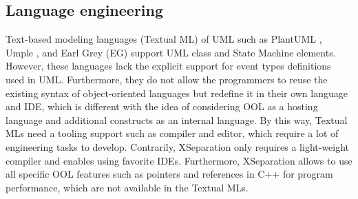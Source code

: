 \subsection{Language engineering}
Text-based modeling languages (Textual ML) of UML such as PlantUML \cite{plantuml}, Umple \cite{lethbridge2010umplification}, and Earl Grey (EG) \cite{mazanec2012general} support UML class and State Machine elements.
However, these languages lack the explicit support for event types definitions used in UML.
Furthermore, they 
do not allow the programmers to reuse the existing syntax of object-oriented languages but redefine it in their own language and IDE, which is different with the idea of considering OOL as a hosting language and additional constructs as an internal language. 
By this way, Textual MLs need a tooling support such as compiler and editor, which require a lot of engineering tasks to develop. 
Contrarily, XSeparation only requires a light-weight compiler and enables using favorite IDEs. %
Furthermore, XSeparation allows to use all specific OOL features such as pointers and references in C++ for program performance, which are not available in the Textual MLs.

\begin{comment}
\begin{itemize}[\footnotesize]
	\item RAOES adapts USM features to existing programming languages while Umple or TextUML does inversely, hence RAOES profits all benefices of IDEs such as intelligent completion and easy to implement. Furthermore, RAOES allows to use all specific C++ features such as function pointers for program efficiency, which are not available in the the TMLs.
	
	\item In RAOES, the programmers write and maintain the USM-based behavior part in the same class/file containing the active class.
	
	\item RAOES support full USM features.
	
	\item RAOES automatically synchronizes the code with the system model specified by UML.
	
	\item RAOES defines the state machine topology separately from the transition table and event definition.
\end{itemize}
\end{comment}


